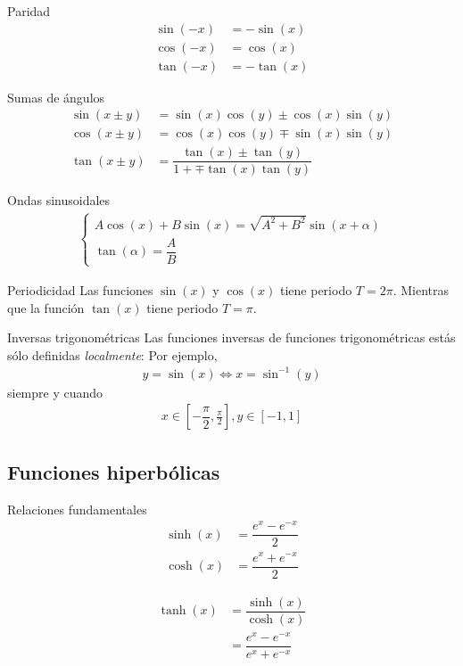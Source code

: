 {Paridad}
     \begin{align*}
   \sin(-x) &= -\sin(x) \\ 
   \cos(-x) &= \cos(x) \\ 
   \tan(-x) &= -\tan(x) 
   \end{align*}

{Sumas de ángulos}
     \begin{align*}
   \sin(x\pm y) &= \sin(x)\cos(y)\pm\cos(x)\sin(y) \\   
   \cos(x\pm y) &= \cos(x)\cos(y)\mp\sin(x)\sin(y) \\   
   \tan(x\pm y) &= \dfrac{\tan(x)\pm \tan(y)}{1+\mp \tan(x)\tan(y)}
   \end{align*}

{Ondas sinusoidales}
     \begin{align*}
   \begin{cases}
A\cos(x)+B\sin(x) = \sqrt{A^{2}+B^{2}}\sin(x+\alpha)\\
\tan(\alpha) = \dfrac{A}{B}
\end{cases}
   \end{align*}

{Periodicidad}
  Las funciones $\sin(x)$ y $\cos(x)$ tiene periodo $T=2\pi$.   
  Mientras que la función $\tan(x)$ tiene periodo $T=\pi$.
  
  
{Inversas trigonométricas}
   Las funciones inversas de funciones trigonométricas estás sólo definidas \emph{localmente}:  Por ejemplo,
      \begin{align*}
     y = \sin(x) \iff x =\sin^{-1}(y)
     \end{align*} 
     siempre y cuando 
          \begin{align*}
      x\in\left[-\dfrac{\pi}{2}, \frac{\pi}{2} \right],
      y\in\left[ -1,1 \right]
      \end{align*}

\subsection{Funciones hiperbólicas}
{Relaciones fundamentales}
 \begin{align*}
\sinh(x) &= \dfrac{e^{x}-e^{-x}}{2}\\ 
\cosh(x) &= \dfrac{e^{x}+e^{-x}}{2}
\end{align*}

{}
\begin{align*}
\tanh(x) &= \dfrac{\sinh(x)}{\cosh(x)}\\ 
&=\dfrac{e^{x}-e^{-x}}{e^{x}+e^{-x}}
 \end{align*}  

